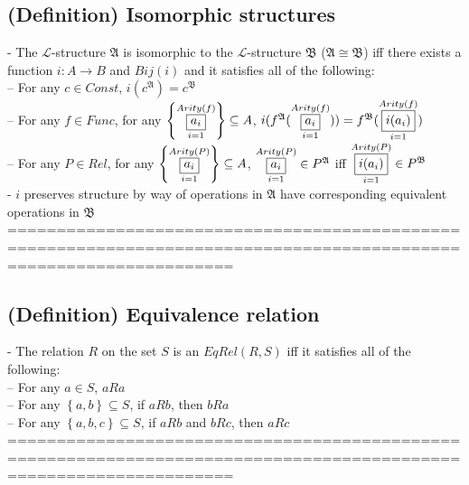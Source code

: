 \documentclass{book}
\newcommand{\means}[2]{#1^{#2}}
\newcommand{\set}[1]{\left\{ #1 \right\}}
\newcommand{\vdc}[3]{\underset{#2}{\overset{#3}{\fbox{$#1$}}}}
\begin{document}
\subsection{(Definition) Isomorphic structures} %
	- The $\mathcal{L}$-structure $\mathfrak{A}$ is isomorphic to the $\mathcal{L}$-structure $\mathfrak{B}$ ($\mathfrak{A} \cong \mathfrak{B}$) iff there exists a function $i: A \rightarrow B$ and $Bij(i)$ and it satisfies all of the following: \\
		-- For any $c \in Const$, $i(\means{c}{\mathfrak{A}}) = \means{c}{\mathfrak{B}}$ \\
		-- For any $f \in Func$, for any $\set{\vdc{a_i}{i=1}{Arity(f)}} \subseteq A$, $i(\means{f}{\mathfrak{A}}(\vdc{a_i}{i=1}{Arity(f)})) = \means{f}{\mathfrak{B}}(\vdc{i(a_i)}{i=1}{Arity(f)})$ \\
		-- For any $P \in Rel$, for any $\set{\vdc{a_i}{i=1}{Arity(P)}} \subseteq A$, $\vdc{a_i}{i=1}{Arity(P)} \in \means{P}{\mathfrak{A}}$ iff $\vdc{i(a_i)}{i=1}{Arity(P)} \in \means{P}{\mathfrak{B}}$ \\
	- $i$ preserves structure by way of operations in $\mathfrak{A}$ have corresponding equivalent operations in $\mathfrak{B}$ \\
	===================================================================================================================
\subsection{(Definition) Equivalence relation} %
	- The relation $R$ on the set $S$ is an $EqRel(R, S)$ iff it satisfies all of the following: \\
		-- For any $a \in S$, $a R a$ \\
		-- For any $\set{a, b} \subseteq S$, if $a R b$, then $b R a$ \\
		-- For any $\set{a, b, c} \subseteq S$, if $a R b$ and $b R c$, then $a R c$ \\
	===================================================================================================================
\end{document}
